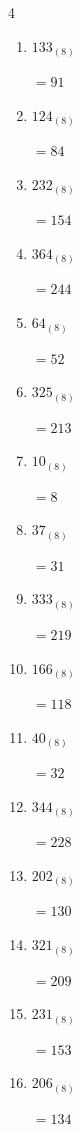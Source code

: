 \begin{multicols}{4}
\begin{enumerate}
        $=35$

  \item $133_{(8)}$

        $=91$

  \item $124_{(8)}$

        $=84$

  \item $232_{(8)}$

        $=154$

  \item $364_{(8)}$

        $=244$

  \item $64_{(8)}$

        $=52$

\columnbreak %

  \item $325_{(8)}$

        $=213$

  \item $10_{(8)}$

        $=8$

  \item $37_{(8)}$

        $=31$

  \item $333_{(8)}$

        $=219$

  \item $166_{(8)}$

        $=118$

  \item $40_{(8)}$

        $=32$

  \item $344_{(8)}$

        $=228$

  \item $202_{(8)}$

        $=130$

  \item $321_{(8)}$

        $=209$

  \item $231_{(8)}$

        $=153$

  \item $206_{(8)}$

        $=134$


\end{enumerate}
\end{multicols}
